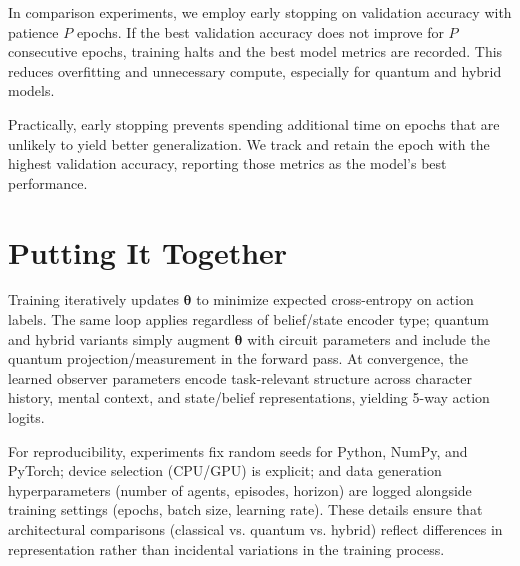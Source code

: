 \documentclass[11pt]{article}
\begin{document}
In comparison experiments, we employ early stopping on validation accuracy with patience $P$ epochs. If the best validation accuracy does not improve for $P$ consecutive epochs, training halts and the best model metrics are recorded. This reduces overfitting and unnecessary compute, especially for quantum and hybrid models.

Practically, early stopping prevents spending additional time on epochs that are unlikely to yield better generalization. We track and retain the epoch with the highest validation accuracy, reporting those metrics as the model’s best performance.

\section{Putting It Together}

Training iteratively updates $\bm{\theta}$ to minimize expected cross-entropy on action labels. The same loop applies regardless of belief/state encoder type; quantum and hybrid variants simply augment $\bm{\theta}$ with circuit parameters and include the quantum projection/measurement in the forward pass. At convergence, the learned observer parameters encode task-relevant structure across character history, mental context, and state/belief representations, yielding 5-way action logits.

For reproducibility, experiments fix random seeds for Python, NumPy, and PyTorch; device selection (CPU/GPU) is explicit; and data generation hyperparameters (number of agents, episodes, horizon) are logged alongside training settings (epochs, batch size, learning rate). These details ensure that architectural comparisons (classical vs. quantum vs. hybrid) reflect differences in representation rather than incidental variations in the training process.
\end{document}
